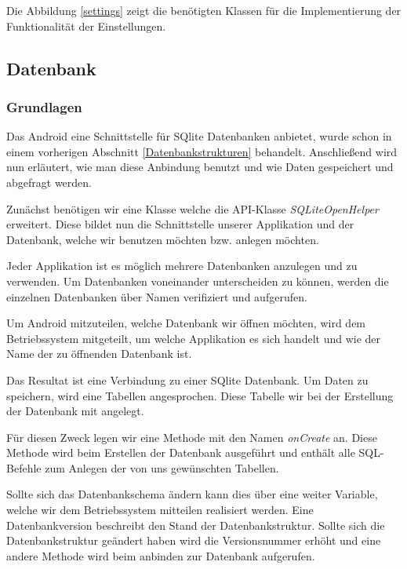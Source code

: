 Die Abbildung \ref{settings} zeigt die benötigten Klassen für die Implementierung der Funktionalität der Einstellungen.

\subsection{Datenbank}

\subsubsection{Grundlagen}

Das Android eine Schnittstelle für SQlite Datenbanken anbietet, wurde schon in einem vorherigen Abschnitt \ref{Datenbankstrukturen} behandelt. Anschließend wird nun erläutert, wie man diese Anbindung benutzt und wie Daten gespeichert und abgefragt werden.

Zunächst benötigen wir eine Klasse welche die API-Klasse \textit{SQLiteOpenHelper} erweitert. Diese bildet nun die Schnittstelle unserer Applikation und der Datenbank, welche wir benutzen möchten bzw. anlegen möchten.

Jeder Applikation ist es möglich mehrere Datenbanken anzulegen und zu verwenden. Um Datenbanken voneinander unterscheiden zu können, werden die einzelnen Datenbanken über Namen verifiziert und aufgerufen.

Um Android mitzuteilen, welche Datenbank wir öffnen möchten, wird dem Betriebssystem mitgeteilt, um welche Applikation es sich handelt und wie der Name der zu öffnenden Datenbank ist.

Das Resultat ist eine Verbindung zu einer SQlite Datenbank. Um Daten zu speichern, wird eine Tabellen angesprochen. Diese Tabelle wir bei der Erstellung der Datenbank mit angelegt.

Für diesen Zweck legen wir eine Methode mit den Namen \textit{onCreate} an. Diese Methode wird beim Erstellen der Datenbank ausgeführt und enthält alle SQL-Befehle zum Anlegen der von uns gewünschten Tabellen.

Sollte sich das Datenbankschema ändern kann dies über eine weiter Variable, welche wir dem Betriebssystem mitteilen realisiert werden. Eine Datenbankversion beschreibt den Stand der Datenbankstruktur. Sollte sich die Datenbankstruktur geändert haben wird die Versionsnummer erhöht und eine andere Methode wird beim anbinden zur Datenbank aufgerufen.

